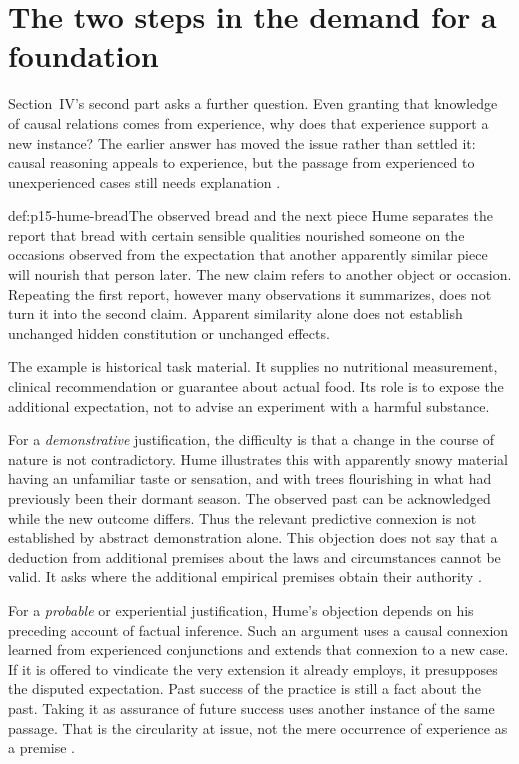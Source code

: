\section{The two steps in the demand for a foundation}
\label{sec:p15-hume-uniformity}

Section~IV's second part asks a further question. Even granting that
knowledge of causal relations comes from experience, why does that
experience support a new instance? The earlier answer has moved the
issue rather than settled it: causal reasoning appeals to experience,
but the passage from experienced to unexperienced cases still needs
explanation \parencite[E~4.14--4.16]{Hume1777EnquiryHTO}.

\begin{hbexample}{def:p15-hume-bread}{The observed bread and the next piece}
Hume separates the report that bread with certain sensible qualities
nourished someone on the occasions observed from the expectation that
another apparently similar piece will nourish that person later.
The new claim refers to another object or occasion. Repeating the
first report, however many observations it summarizes, does not turn
it into the second claim. Apparent similarity alone does not establish
unchanged hidden constitution or unchanged effects.

The example is historical task material. It supplies no nutritional
measurement, clinical recommendation or guarantee about actual food.
Its role is to expose the additional expectation, not to advise an
experiment with a harmful substance.
\end{hbexample}

For a \emph{demonstrative} justification, the difficulty is that a change
in the course of nature is not contradictory. Hume illustrates this
with apparently snowy material having an unfamiliar taste or sensation,
and with trees flourishing in what had previously been their dormant
season. The observed past can be acknowledged while the new outcome
differs. Thus the relevant predictive connexion is not established by
abstract demonstration alone. This objection does not say that a
deduction from additional premises about the laws and circumstances
cannot be valid. It asks where the additional empirical premises obtain
their authority \parencite[E~4.18]{Hume1777EnquiryHTO}.

For a \emph{probable} or experiential justification, Hume's objection
depends on his preceding account of factual inference. Such an argument
uses a causal connexion learned from experienced conjunctions and extends
that connexion to a new case. If it is offered to vindicate the very
extension it already employs, it presupposes the disputed expectation.
Past success of the practice is still a fact about the past. Taking it
as assurance of future success uses another instance of the same passage.
That is the circularity at issue, not the mere occurrence of experience
as a premise \parencite[E~4.19--4.21]{Hume1777EnquiryHTO}.

